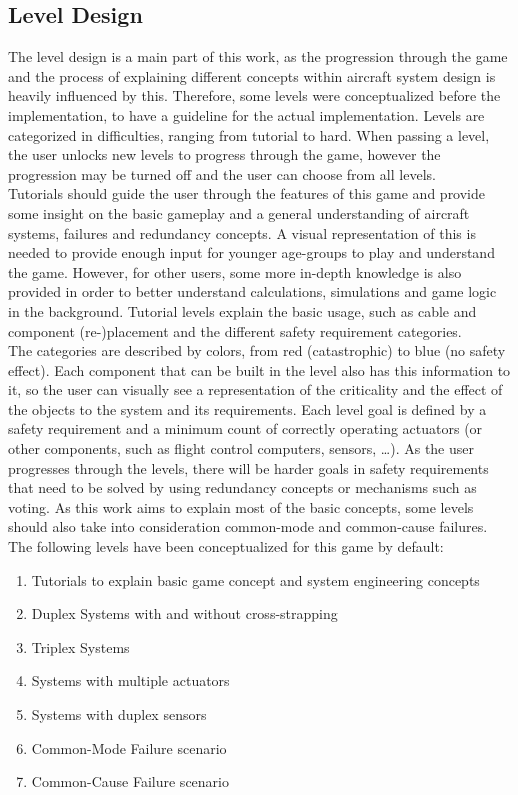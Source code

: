\subsection{Level Design}\label{subsec:level-design}
The level design is a main part of this work, as the progression through the game and the process of explaining different concepts
within aircraft system design is heavily influenced by this.
Therefore, some levels were conceptualized before the implementation, to have a guideline for the actual implementation.
Levels are categorized in difficulties, ranging from tutorial to hard.
When passing a level, the user unlocks new levels to progress through the game, however the progression may be turned off and the user can choose from all
levels.
\\
Tutorials should guide the user through the features of this game and provide some insight on the basic gameplay and a general
understanding of aircraft systems, failures and redundancy concepts.
A visual representation of this is needed to provide enough input for younger age-groups to play and understand the game.
However, for other users, some more in-depth knowledge is also provided in order to better understand calculations, simulations and
game logic in the background.
Tutorial levels explain the basic usage, such as cable and component (re-)placement and the different safety requirement
categories.
\\
The categories are described by colors, from red (catastrophic) to blue (no safety effect).
Each component that can be built in the level also has this information to it, so the user can visually see a representation
of the criticality and the effect of the objects to the system and its requirements.
Each level goal is defined by a safety requirement and a minimum count of correctly operating actuators (or other components, such
as flight control computers, sensors, \ldots).
As the user progresses through the levels, there will be harder goals in safety requirements that need to be solved by using
redundancy concepts or mechanisms such as voting.
As this work aims to explain most of the basic concepts, some levels should also take into consideration common-mode and common-cause
failures.
\\
The following levels have been conceptualized for this game by default:
\begin{enumerate}
    \item Tutorials to explain basic game concept and system engineering concepts
    \item Duplex Systems with and without cross-strapping
    \item Triplex Systems
    \item Systems with multiple actuators
    \item Systems with duplex sensors
    \item Common-Mode Failure scenario
    \item Common-Cause Failure scenario
\end{enumerate}
